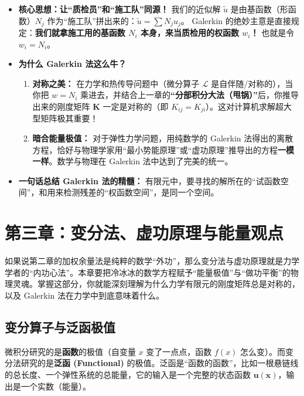 \documentclass[11pt, a4paper, UTF8]{ctexart}
\begin{document}
\begin{itemize}
    \item \textbf{核心思想：让“质检员”和“施工队”同源！}
    我们的近似解 $\tilde{u}$ 是由基函数（形函数）$N_j$ 作为“施工队”拼出来的：$\tilde{u} = \sum N_j u_j$。
    Galerkin 的绝妙主意是直接规定：\textbf{我们就拿施工用的基函数 $N_i$ 本身，来当质检用的权函数 $w_i$！}
    也就是令 $w_i = N_i$。
    
    \item \textbf{为什么 Galerkin 法这么牛？}
    \begin{enumerate}
    \item \textbf{对称之美：} 在力学和热传导问题中（微分算子 $\mathcal{L}$ 是自伴随/对称的），当你把 $w=N_i$ 乘进去，并结合上一章的\textbf{“分部积分大法（甩锅）”}后，你推导出来的刚度矩阵 $\bm{K}$ 一定是对称的（即 $K_{ij} = K_{ji}$）。这对计算机求解超大型矩阵极其重要！
        \item \textbf{暗合能量极值：} 对于弹性力学问题，用纯数学的 Galerkin 法得出的离散方程，恰好与物理学家用“最小势能原理”或“虚功原理”推导出的方程\textbf{一模一样}。数学与物理在 Galerkin 法中达到了完美的统一。
    \end{enumerate}
    \item \textbf{一句话总结 Galerkin 法的精髓：} 
    有限元中，要寻找的解所在的“试函数空间”，和用来检测残差的“权函数空间”，是同一个空间。
\end{itemize}

\section{第三章：变分法、虚功原理与能量观点}
如果说第二章的加权余量法是纯粹的数学“外功”，那么变分法与虚功原理就是力学学者的“内功心法”。本章要把冷冰冰的数学方程赋予“能量极值”与“做功平衡”的物理灵魂。掌握这部分，你就能深刻理解为什么力学有限元的刚度矩阵总是对称的，以及 Galerkin 法在力学中到底意味着什么。

\subsection{变分算子与泛函极值}
微积分研究的是\textbf{函数}的极值（自变量 $x$ 变了一点点，函数 $f(x)$ 怎么变）。而变分法研究的是\textbf{泛函 (Functional)} 的极值。泛函是“函数的函数”，比如一根悬链线的总长度、一个弹性系统的总能量，它的输入是一个完整的状态函数 $\bm{u}(\bm{x})$，输出是一个实数（能量）。
\end{document}
